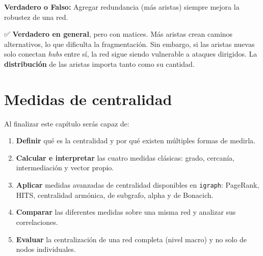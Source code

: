 \documentclass[
  letterpaper,
  DIV=11,
  numbers=noendperiod]{scrreprt}
\providecommand{\tightlist}{%
  \setlength{\itemsep}{0pt}\setlength{\parskip}{0pt}}
\begin{document}
\begin{tcolorbox}[enhanced jigsaw, toprule=.15mm, colframe=quarto-callout-caution-color-frame, coltitle=black, titlerule=0mm, colback=white, breakable, leftrule=.75mm, arc=.35mm, bottomtitle=1mm, toptitle=1mm, rightrule=.15mm, bottomrule=.15mm, left=2mm, title=\textcolor{quarto-callout-caution-color}{\faFire}\hspace{0.5em}{Pregunta 5}, colbacktitle=quarto-callout-caution-color!10!white, opacityback=0, opacitybacktitle=0.6]

\textbf{Verdadero o Falso:} Agregar redundancia (más aristas) siempre
mejora la robustez de una red.

✅ \textbf{Verdadero en general}, pero con matices. Más aristas crean
caminos alternativos, lo que dificulta la fragmentación. Sin embargo, si
las aristas nuevas solo conectan \emph{hubs} entre sí, la red sigue
siendo vulnerable a ataques dirigidos. La \textbf{distribución} de las
aristas importa tanto como su cantidad.

\end{tcolorbox}


\chapter{Medidas de centralidad}\label{sec-centralidad}

\begin{tcolorbox}[enhanced jigsaw, toprule=.15mm, colframe=quarto-callout-note-color-frame, coltitle=black, titlerule=0mm, colback=white, breakable, leftrule=.75mm, arc=.35mm, bottomtitle=1mm, toptitle=1mm, rightrule=.15mm, bottomrule=.15mm, left=2mm, title=\textcolor{quarto-callout-note-color}{\faInfo}\hspace{0.5em}{🎯 Objetivos de aprendizaje}, colbacktitle=quarto-callout-note-color!10!white, opacityback=0, opacitybacktitle=0.6]

Al finalizar este capítulo serás capaz de:

\begin{enumerate}
\def\labelenumi{\arabic{enumi}.}
\tightlist
\item
  \textbf{Definir} qué es la centralidad y por qué existen múltiples
  formas de medirla.
\item
  \textbf{Calcular e interpretar} las cuatro medidas clásicas: grado,
  cercanía, intermediación y vector propio.
\item
  \textbf{Aplicar} medidas avanzadas de centralidad disponibles en
  \texttt{igraph}: PageRank, HITS, centralidad armónica, de subgrafo,
  alpha y de Bonacich.
\item
  \textbf{Comparar} las diferentes medidas sobre una misma red y
  analizar sus correlaciones.
\item
  \textbf{Evaluar} la centralización de una red completa (nivel macro) y
  no solo de nodos individuales.
\end{enumerate}

\end{tcolorbox}
\end{document}
